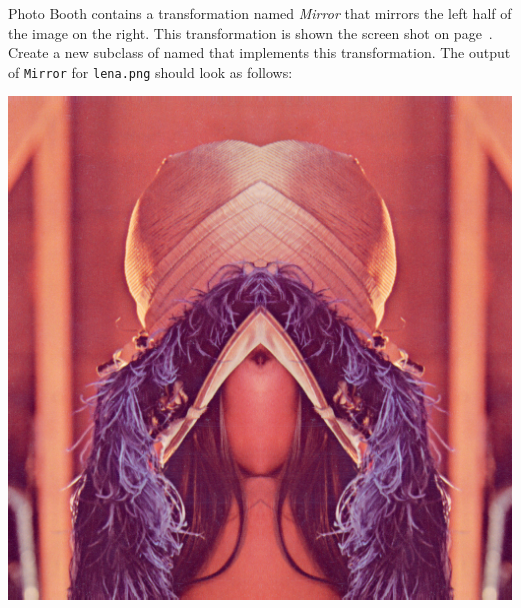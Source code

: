 \documentclass{book}
\begin{document}
\begin{exercise}
Photo Booth contains a transformation named \emph{Mirror} that mirrors the left half of the image on the right. This transformation is shown the screen shot on page~\pageref{img:photobooth}. Create a new subclass of  named  that implements this transformation. The output of \texttt{Mirror} for \texttt{lena.png} should look as follows:
\begin{center}
\includegraphics[scale=0.2]{lena-mirror.png}
\end{center} 
\end{exercise}
\end{document}
